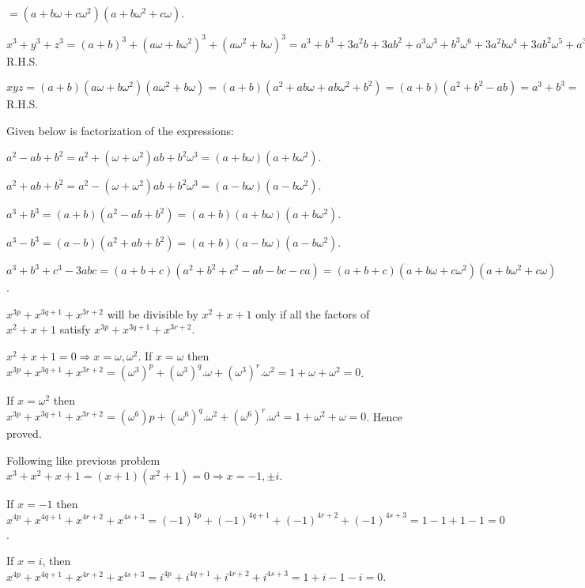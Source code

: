   $= (a + b\omega + c\omega^2)(a + b\omega^2 + c\omega)$.
\item $x^3 + y^3 + z^3 = (a + b)^3 + (a\omega + b\omega^2)^3 + (a\omega^2 + b\omega)^3 = a^3 + b^3 + 3a^2b +
  3ab^2 + a^3\omega^3 + b^3\omega^6 + 3a^2b\omega^4 + 3ab^2\omega^5 + a^3\omega^6 + b^3\omega^3 +
  3a^2b\omega^5 + 3ab^2\omega^4 = 3[a^3 + b^3 + 3a^2b(1 + \omega + \omega^2) + 3ab^2(1 + \omega + \omega^2)]
  = 3(a^3 + b^3) = $R.H.S.

  $xyz = (a + b)(a\omega + b\omega^2)(a\omega^2 + b\omega) = (a + b)(a^2 + ab\omega + ab\omega^2 + b^2) = (a
  + b)(a^2 + b^2 - ab) = a^3 + b^3 =$ R.H.S.
\item Given below is factorization of the expressions:
  \startitemize[i]
  \item $a^2 - ab + b^2 = a^2 + (\omega + \omega^2)ab + b^2\omega^3 = (a + b\omega)(a + b\omega^2)$.
  \item $a^2 + ab + b^2 = a^2 - (\omega + \omega^2)ab + b^2\omega^3 = (a - b\omega)(a - b\omega^2)$.
  \item $a^3 + b^3 = (a + b)(a^2 - ab + b^2) = (a + b)(a + b\omega)(a + b\omega^2)$.
  \item $a^3 - b^3 = (a - b)(a^2 + ab + b^2) = (a + b)(a - b\omega)(a - b\omega^2)$.
  \item $a^3 + b^3 + c^3 - 3abc = (a + b + c)(a^2 + b^2 + c^2 - ab - bc - ca) = (a + b + c)(a + b\omega +
    c\omega^2)(a + b\omega^2 + c\omega)$.
  \stopitemize
\item $x^{3p} + x^{3q + 1} + x^{3r + 2}$ will be divisible by $x^2 + x + 1$ only if all the factors of $x^2
  + x + 1$ satisfy $x^{3p} + x^{3q + 1} + x^{3r + 2}$.

  $x^2 + x + 1 = 0\Rightarrow x = \omega, \omega^2$. If $x = \omega$ then $x^{3p} + x^{3q + 1} + x^{3r + 2}
  = (\omega^3)^p + (\omega^3)^q.\omega + (\omega^3)^r.\omega^2 = 1 + \omega + \omega^2 = 0$.

  If $x = \omega^2$ then $x^{3p} + x^{3q + 1} + x^{3r + 2} = (\omega^6)p + (\omega^6)^q.\omega^2 +
  (\omega^6)^r.\omega^4 = 1 + \omega^2 + \omega = 0$. Hence proved.
\item Following like previous problem $x^3 + x^2 + x + 1 = (x + 1)(x^2 + 1) = 0 \Rightarrow x = -1, \pm i$.

  If $x = -1$ then $x^{4p} + x^{4q + 1} + x^{4r + 2} + x^{4s + 3} = (-1)^{4p} + (-1)^{4q + 1} + (-1)^{4r +
    2} + (-1)^{4s + 3} = 1 - 1 + 1 - 1 = 0$.

  If $x = i$, then $x^{4p} + x^{4q + 1} + x^{4r + 2} + x^{4s + 3} = i^{4p} + i^{4q + 1} + i^{4r + 2} + i^{4s
    + 3} = 1 + i - 1 - i = 0$.

